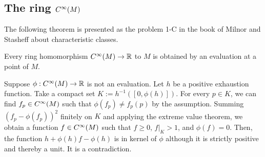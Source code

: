 \documentclass{../exp}
\begin{document}
\iffalse
in general, the following implications hold:
mul functional -> max ideal:   the converse holds if every residue field is isomorphic (e.g. Gelfand-Mazur thm)
point -> mul functional:       the converse holds if .... case by case
\fi


\subsection{The ring $C^\infty(M)$}
The following theorem is presented as the problem 1-C in the book of Milnor and Stasheff about characteristic classes.
\begin{thm}
Every ring homomorphism $C^\oo(M)\to\R$ to $M$ is obtained by an evaluation at a point of $M$.
\end{thm}
\begin{pf}
Suppose $\phi:C^\oo(M)\to\R$ is not an evaluation.
Let $h$ be a positive exhaustion function.
Take a compact set $K:=h^{-1}([0,\phi(h)])$.
For every $p\in K$, we can find $f_p\in C^\infty(M)$ such that $\phi(f_p)\ne f_p(p)$ by the assumption.
Summing $(f_p-\phi(f_p))^2$ finitely on $K$ and applying the extreme value theorem, we obtain a function $f\in C^\infty(M)$ such that $f\ge0$, $f|_K>1$, and $\phi(f)=0$.
Then, the function $h+\phi(h)f-\phi(h)$ is in kernel of $\phi$ although it is strictly positive and thereby a unit.
It is a contradiction.
\end{pf}
\end{document}

